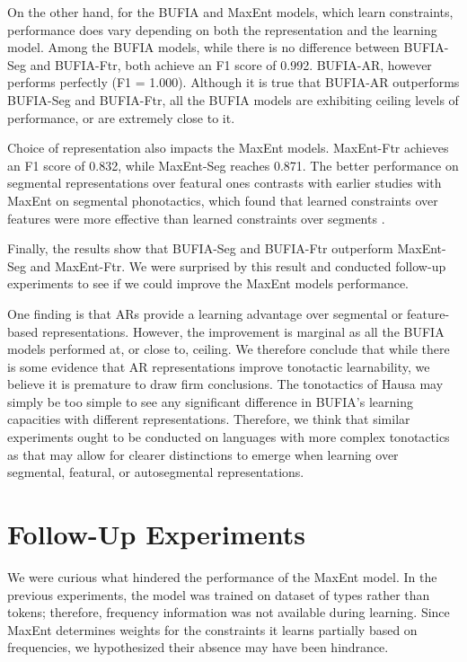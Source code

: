 \documentclass[11pt]{article}
\begin{document}


On the other hand, for the BUFIA and MaxEnt models, which learn constraints,
performance does vary depending on both the representation and the learning
model.
Among the BUFIA models, while there is no difference between BUFIA-Seg and
BUFIA-Ftr,
both achieve an F1 score of 0.992. BUFIA-AR, however performs perfectly (F1 =
1.000).
Although it is true that BUFIA-AR outperforms BUFIA-Seg and BUFIA-Ftr,
all the BUFIA models are exhibiting ceiling levels of performance,
or are extremely close to it.

Choice of representation also impacts the MaxEnt models.
MaxEnt-Ftr achieves an F1 score of 0.832, while MaxEnt-Seg reaches
0.871. The better performance on segmental representations over featural ones
contrasts with earlier studies with MaxEnt on segmental phonotactics, which
found that learned constraints over features were more effective
than learned constraints over segments \citep{hayes2008maximum,
  wilson2018accidental}.

Finally, the results show that BUFIA-Seg and BUFIA-Ftr outperform
MaxEnt-Seg and MaxEnt-Ftr. We were surprised by this result and
conducted follow-up experiments to see if we could improve the
MaxEnt models performance.


One finding is that ARs provide a learning advantage over segmental or
feature-based representations.
However, the improvement is marginal as all the BUFIA models performed at,
or close to, ceiling.
We therefore conclude that while there is some evidence that
AR representations improve tonotactic learnability,
we believe it is premature to draw firm conclusions.
The tonotactics of Hausa may simply be too simple to see
any significant difference in BUFIA's learning capacities with different representations.
Therefore, we think that similar experiments ought to be conducted
on languages with more complex tonotactics as that may allow for
clearer distinctions to emerge when learning over
segmental, featural, or autosegmental representations.


\section{Follow-Up Experiments}


We were curious what hindered the performance of the MaxEnt model.
In the previous experiments,
the model was trained on dataset of types rather than tokens; therefore,
frequency information was not available during learning.
Since MaxEnt determines weights for the constraints it learns
partially based on frequencies,
we hypothesized their absence may have been hindrance.
\end{document}
